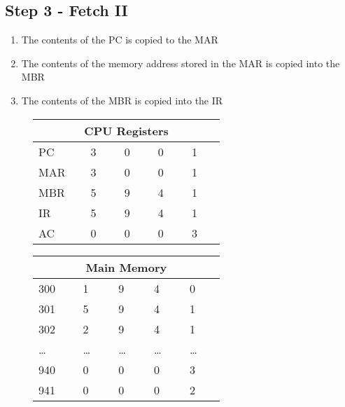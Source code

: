 \subsection*{Step 3 - Fetch II}
\begin{enumerate}
    \item The contents of the PC is copied to the MAR
    \item The contents of the memory address stored in the MAR is copied into the MBR
    \item The contents of the MBR is copied into the IR
\end{enumerate}

\begin{figure}[H]
    \begin{minipage}[t]{0.45\textwidth}
        \centering
        \begin{tabular}[H]{p{0.15\linewidth} p{0.12\linewidth} p{0.12\linewidth} p{0.12\linewidth} p{0.12\linewidth}}
            \multicolumn{5}{c}{\textbf{CPU Registers}}\\
            \hline
            \hline
            PC & 3 & 0 & 0 & 1 \\
            \hline
            MAR & 3 & 0 & 0 & 1 \\
            \hline
            MBR & 5 & 9 & 4 & 1 \\
            \hline
            IR & 5 & 9 & 4 & 1 \\
            \hline
            AC & 0 & 0 & 0 & 3 \\
            \hline
        \end{tabular}
    \end{minipage}\hfill
    \begin{minipage}[t]{0.45\textwidth}
        \centering
        \begin{tabular}[H]{p{0.15\linewidth} p{0.12\linewidth} p{0.12\linewidth} p{0.12\linewidth} p{0.12\linewidth}}
            \multicolumn{5}{c}{\textbf{Main Memory}}\\
            \hline
            \hline
            300 & 1 & 9 & 4 & 0 \\
            \hline
            301 & 5 & 9 & 4 & 1 \\
            \hline
            302 & 2 & 9 & 4 & 1 \\
            \hline
            \ldots & \ldots & \ldots & \ldots & \ldots \\
            \hline
            940 & 0 & 0 & 0 & 3 \\
            \hline
            941 & 0 & 0 & 0 & 2 \\
            \hline
        \end{tabular}
    \end{minipage}\hfill
\end{figure}

